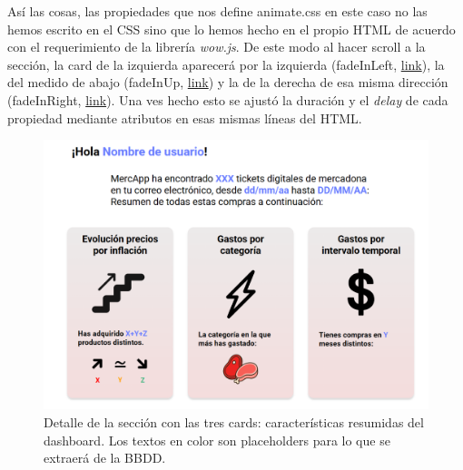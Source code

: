 \documentclass[a4paper,12pt]{report}
\begin{document}
	Así las cosas, las propiedades que nos define animate.css en este caso no las hemos escrito en el CSS sino que lo hemos hecho en el propio HTML de acuerdo con el requerimiento de la librería \textit{wow.js}. De este modo al hacer scroll a la sección, la card de la izquierda aparecerá por la izquierda (fadeInLeft,  \href{https://github.com/blackcub3s/mercApp/blob/663360ea63eafd38c1fa052e7a994e22d7f0a5f6/APP%20WEB/__frontend__produccio__/app/dashboard.html#L130}{link}), la del medido de abajo (fadeInUp,  \href{https://github.com/blackcub3s/mercApp/blob/663360ea63eafd38c1fa052e7a994e22d7f0a5f6/APP%20WEB/__frontend__produccio__/app/dashboard.html#L153}{link}) y la de la derecha de esa misma dirección (fadeInRight,  \href{https://github.com/blackcub3s/mercApp/blob/663360ea63eafd38c1fa052e7a994e22d7f0a5f6/APP%20WEB/__frontend__produccio__/app/dashboard.html#L173}{link}). Una ves hecho esto se ajustó la duración y el \textit{delay} de cada propiedad mediante atributos en esas mismas líneas del HTML.
	
	
	\FloatBarrier
	\begin{figure}[H]
		\centering
		\caption{Detalle de la sección con las tres cards: características resumidas del dashboard. Los textos en color son placeholders para lo que se extraerá de la BBDD.}
		\label{fig:s2caracteristiquesmercapp}
		\includegraphics[width=1\linewidth]{img/s2CaracteristiquesMercApp.png}
	\end{figure}
	\FloatBarrier
	
\end{document}
